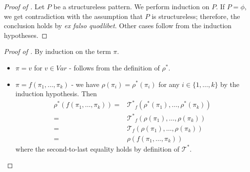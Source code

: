 

\begin{proof}[Proof of ]
Let $P$ be a structureless pattern.
We perform induction on $P$.
If $P = \phi$, we get contradiction with the assumption that $P$ is structureless;
therefore, the conclusion holds by \emph{ex falso quodlibet}.
Other cases follow from the induction hypotheses.
\end{proof}


\begin{proof}[Proof of ]
    By induction on the term $\pi$.
    \begin{itemize}
        \item $\pi = v$ for $v \in \mathit{Var}$ - follows from the definition of $\rho^*$.
        \item $\pi = f(\pi_1, \ldots, \pi_k)$ - we have $\rho(\pi_i) = \rho^*(\pi_i)$ for any $i \in \{ 1, \ldots, k \}$
              by the induction hypothesis.
              Then
              \begin{align*}
                  \rho^*(f(\pi_1, \ldots, \pi_k)) 
                  = & {\mathcal{T}^*}_f(\rho^*(\pi_1), \ldots, \rho^*(\pi_k)) \\
                  = & {\mathcal{T}^*}_f(\rho(\pi_1), \ldots, \rho(\pi_k)) \\
                  = & \mathcal{T}_f(\rho(\pi_1), \ldots, \rho(\pi_k)) \\
                  = & \rho(f(\pi_1, \ldots, \pi_k))
              \end{align*}
              where the second-to-last equality holds by definition of $\mathcal{T}^*$.
    \end{itemize}
\end{proof}


